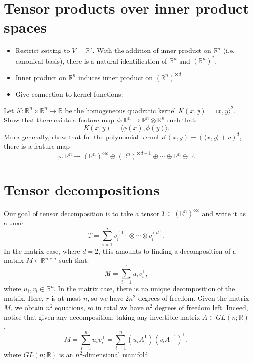 \section{Tensor products over inner product spaces}

\begin{itemize}
    \item Restrict setting to $V = \mathbb{R}^n$. With the addition of inner product on $\mathbb{R}^n$ (i.e. canonical basis), there is a natural identification of $\mathbb{R}^n$ and $(\mathbb{R}^n)^*$.
    \item Inner product on $\mathbb{R}^n$ induces inner product on $(\mathbb{R}^n)^{\otimes d}$
    \item Give connection to kernel functions:
\end{itemize}

\begin{exercise}
Let $K : \mathbb{R}^n \times \mathbb{R}^n \to \mathbb{R}$ be the homogeneous quadratic kernel $K(x,y) = \langle x, y\rangle^2$. Show that there exists a feature map $\phi: \mathbb{R}^n \to \mathbb{R}^n \otimes \mathbb{R}^n$ such that:
\[K(x,y) = \langle \phi(x), \phi(y)\rangle.\]
More generally, show that for the polynomial kernel $K(x,y) = (\langle x,y\rangle + c)^d$, there is a feature map \[\phi: \mathbb{R}^n \to (\mathbb{R}^n)^{\otimes d} \oplus (\mathbb{R}^n)^{\otimes d-1}\oplus \dotsm \oplus \mathbb{R}^n \oplus \mathbb{R}.\] 
\end{exercise}

\section{Tensor decompositions}
Our goal of tensor decomposition is to take a tensor $T \in (\mathbb{R}^n)^{\otimes d}$ and write it as a sum:
\[T = \sum_{i=1}^r v^{(1)}_i \otimes \dotsm \otimes v^{(d)}_i.\]
In the matrix case, where $d = 2$, this amounts to finding a decomposition of a matrix $M \in \mathbb{R}^{n \times n}$ such that:
\[M = \sum_{i=1}^r u_i v_i^\mathsf{T},\]
where $u_i, v_i \in \mathbb{R}^n$. In the matrix case, there is no unique decomposition of the matrix. Here, $r$ is at most $n$, so we have $2 n^2$ degrees of freedom. Given the matrix $M$, we obtain $n^2$ equations, so in total we have $n^2$ degrees of freedom left. Indeed, notice that given any decomposition, taking any invertible matrix $A \in GL(n;\mathbb{R})$,
\[M = \sum_{i=1}^n u_i v_i^\mathsf{T} = \sum_{i=1}^n (u_i A^\mathsf{T})(v_iA^{-1})^\mathsf{T},\]
where $GL(n;\mathbb{R})$ is an $n^2$-dimensional manifold.

